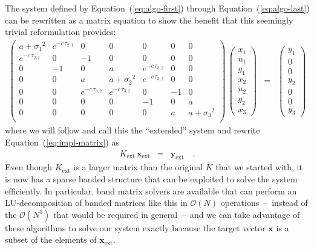 \documentclass[manuscript, letterpaper]{aastex6}
\renewcommand{\eqref}[1]{\ref{eq:#1}}
\newcommand{\Eq}[1]{Equation~(\eqref{#1})}
\newcommand{\eq}[1]{\Eq{#1}}
\newcommand{\bvec}[1]{{\ensuremath{\boldsymbol{#1}}}}
\begin{document}
The system defined by \eq{algo-first} through \eq{algo-last} can be
rewritten as a matrix equation to show the benefit that this seemingly trivial
reformulation provides:
\begin{eqnarray}
\begin{pmatrix}
    a+{\sigma_1}^2 & e^{-c\,\tau_{2,1}} & 0 & 0 & 0 & 0 & 0 \\
    e^{-c\,\tau_{2,1}} & 0 & -1 & 0 & 0 & 0 & 0 \\
    0 & -1 & 0 & a & e^{-c\,\tau_{3,2}} & 0 & 0 \\
    0 & 0 & a & a+{\sigma_2}^2 & e^{-c\,\tau_{3,2}} & 0 & 0 \\
    0 & 0 & e^{-c\,\tau_{3,2}} & e^{-c\,\tau_{3,2}} & 0 & -1 & 0 \\
    0 & 0 & 0 & 0 & -1 & 0 & a \\
    0 & 0 & 0 & 0 & 0 & a & a+{\sigma_3}^2 \\
\end{pmatrix}\,
\begin{pmatrix}
    x_1 \\ u_1 \\ g_1 \\ x_2 \\ u_2 \\ g_2 \\ x_3
\end{pmatrix} &=&
\begin{pmatrix}
    y_1 \\ 0 \\ 0 \\ y_2 \\ 0 \\ 0 \\ y_3
\end{pmatrix}\nonumber
\end{eqnarray}
where we will follow \citet{Ambikasaran:2015} and call this the ``extended''
system and rewrite \eq{impl-matrix} as
\begin{eqnarray}
    K_\mathrm{ext}\,\bvec{x}_\mathrm{ext} &=& \bvec{y}_\mathrm{ext} \quad.
\end{eqnarray}
Even though $K_\mathrm{ext}$ is a larger matrix than the original $K$ that we
started with, it is now has a sparse banded structure that can be exploited to
solve the system efficiently.
In particular, band matrix solvers are available that can perform an
LU-decomposition of banded matrices like this in $\mathcal{O}(N)$
operations~--~instead of the $\mathcal{O}(N^3)$ that would be required in
general~--~and we can take advantage of these algorithms to solve our system
exactly because the target vector $\bvec{x}$ is a subset of the elements of
$\bvec{x}_\mathrm{ext}$.
\end{document}
